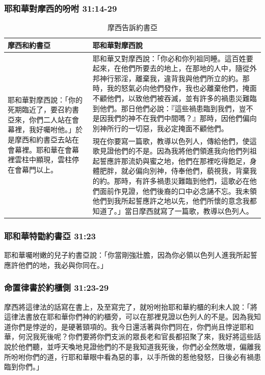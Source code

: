 \subsubsection{耶和華對摩西的吩咐 31:14-29 }
\begin{table}[H]
\begin{center}
\begin{tabular}{ p{}|p{}} \toprule
摩西和約書亞&耶和華對摩西說\\\hline
\multirow{ 2}{3.cm}{耶和華對摩西說：「你的死期臨近了，要召約書亞來，你們二人站在會幕裡，我好囑咐他。」於是摩西和約書亞去站在會幕裡。耶和華在會幕裡雲柱中顯現，雲柱停在會幕門以上。}&耶和華又對摩西說：「你必和你列祖同睡。這百姓要起來，在他們所要去的地上，在那地的人中，隨從外邦神行邪淫，離棄我，違背我與他們所立的約。那時，我的怒氣必向他們發作，我也必離棄他們，掩面不顧他們，以致他們被吞滅，並有許多的禍患災難臨到他們。那日他們必說：『這些禍患臨到我們，豈不是因我們的神不在我們中間嗎？』那時，因他們偏向別神所行的一切惡，我必定掩面不顧他們。\\\cline{2-2}
&現在你要寫一篇歌，教導以色列人，傳給他們，使這歌見證他們的不是。因為我將他們領進我向他們列祖起誓應許那流奶與蜜之地，他們在那裡吃得飽足，身體肥胖，就必偏向別神，侍奉他們，藐視我，背棄我的約。那時，有許多禍患災難臨到他們，這歌必在他們面前作見證，他們後裔的口中必念誦不忘。我未領他們到我所起誓應許之地以先，他們所懷的意念我都知道了。」當日摩西就寫了一篇歌，教導以色列人。\\\hline
\end{tabular}
\end{center}
\caption{摩西告訴約書亞}
\end{table}


\newpage
\subsubsection{耶和華特勖約書亞 31:23}
耶和華囑咐嫩的兒子約書亞說：「你當剛強壯膽，因為你必領以色列人進我所起誓應許他們的地，我必與你同在。」

\subsubsection{命置律書於約櫃側 31:23-29}
摩西將這律法的話寫在書上，及至寫完了，就吩咐抬耶和華約櫃的利未人說：「將這律法書放在耶和華你們神的約櫃旁，可以在那裡見證以色列人的不是。因為我知道你們是悖逆的，是硬著頸項的。我今日還活著與你們同在，你們尚且悖逆耶和華，何況我死後呢？你們要將你們支派的眾長老和官長都招聚了來，我好將這些話說於他們聽，並呼天喚地見證他們的不是我知道我死後，你們必全然敗壞，偏離我所吩咐你們的道，行耶和華眼中看為惡的事，以手所做的惹他發怒，日後必有禍患臨到你們。」


